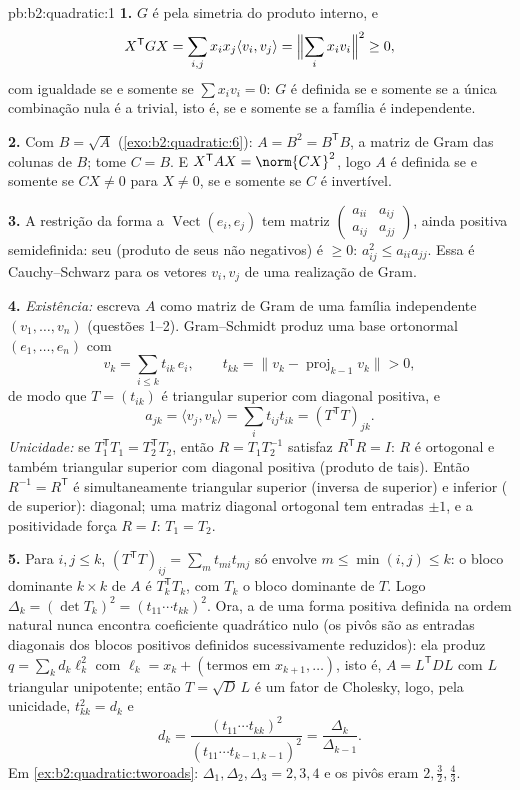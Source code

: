 \begin{solution}{pb:b2:quadratic:1}
\textbf{1.} $G$ é  pela simetria do produto interno,
e
\[
X^{\mathsf T}GX = \sum_{i,j}x_ix_j\langle v_i, v_j\rangle
= \Bigl\|\sum_i x_iv_i\Bigr\|^2 \geq 0 ,
\]
com igualdade se e somente se $\sum x_iv_i = 0$: $G$ é definida se e somente se a
única combinação nula é a trivial, isto é, se e somente se a família é
independente.

\textbf{2.} Com $B = \sqrt A$ (\cref{exo:b2:quadratic:6}): $A
= B^2 = B^{\mathsf T}B$, a matriz de Gram das colunas de $B$;
tome $C = B$. E $X^{\mathsf T}AX = \norm{CX}^2$, logo $A$ é
definida se e somente se $CX \neq 0$ para $X \neq 0$, se e somente se $C$ é invertível.

\textbf{3.} A restrição da forma a
$\operatorname{Vect}(e_i, e_j)$ tem matriz
$\begin{pmatrix} a_{ii} & a_{ij}\\ a_{ij} & a_{jj}
\end{pmatrix}$, ainda positiva semidefinida: seu 
(produto de seus  não negativos) é $\geq 0$:
$a_{ij}^2 \leq a_{ii}a_{jj}$. Essa é Cauchy--Schwarz para os
vetores $v_i, v_j$ de uma realização de Gram.

\textbf{4.} \emph{Existência:} escreva $A$ como matriz de Gram de
uma família independente $(v_1, \dots, v_n)$ (questões 1--2).
Gram--Schmidt produz uma base ortonormal $(e_1, \dots, e_n)$ com
\[
v_k = \sum_{i \leq k} t_{ik}\,e_i,
\qquad t_{kk} = \bigl\| v_k - \operatorname{proj}_{k-1}v_k
\bigr\| > 0 ,
\]
de modo que $T = (t_{ik})$ é triangular superior com diagonal positiva,
e
\[
a_{jk} = \langle v_j, v_k\rangle
= \sum_i t_{ij}t_{ik} = (T^{\mathsf T}T)_{jk} .
\]
\emph{Unicidade:} se $T_1^{\mathsf T}T_1 = T_2^{\mathsf T}T_2$,
então $R = T_1T_2^{-1}$ satisfaz $R^{\mathsf T}R = I$: $R$ é
ortogonal e também triangular superior com diagonal positiva
(produto de tais). Então $R^{-1} = R^{\mathsf T}$ é
simultaneamente triangular superior (inversa de superior) e inferior ( de
superior): diagonal; uma matriz diagonal ortogonal tem
entradas $\pm1$, e a positividade força $R = I$: $T_1 = T_2$.

\textbf{5.} Para $i, j \leq k$, $(T^{\mathsf T}T)_{ij} = \sum_m
t_{mi}t_{mj}$ só envolve $m \leq \min(i,j) \leq k$: o
bloco dominante $k\times k$ de $A$ é $T_k^{\mathsf T}T_k$, com
$T_k$ o bloco dominante de $T$. Logo $\Delta_k = (\det T_k)^2
= (t_{11}\cdots t_{kk})^2$. Ora, a  de uma
forma positiva definida na ordem natural nunca encontra coeficiente
quadrático nulo (os pivôs são as entradas diagonais dos
blocos positivos definidos sucessivamente reduzidos): ela produz $q
= \sum_k d_k\ell_k^2$ com $\ell_k = x_k + (\text{termos em }
x_{k+1}, \dots)$, isto é, $A = L^{\mathsf T}DL$ com $L$
triangular unipotente; então $T = \sqrt D\,L$ é um fator de
Cholesky, logo, pela unicidade, $t_{kk}^2 = d_k$ e
\[
d_k = \frac{(t_{11}\cdots t_{kk})^2}
{(t_{11}\cdots t_{k-1,k-1})^2}
= \frac{\Delta_k}{\Delta_{k-1}} .
\]
Em \cref{ex:b2:quadratic:tworoads}: $\Delta_1, \Delta_2,
\Delta_3 = 2, 3, 4$ e os pivôs eram $2, \frac32, \frac43$.


\end{solution}
